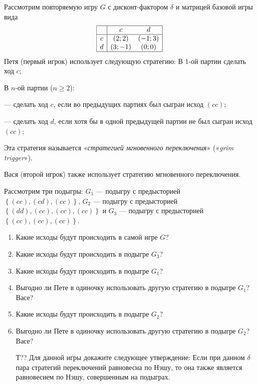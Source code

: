 \begin{problem}

Рассмотрим повторяемую игру  $G$  с дисконт-фактором  $\delta $  и матрицей базовой игры вида
\[\begin{array}{|c|cc|}  \hline {} & {c} & {d} \\  \hline {c} & {(2;2)} & {(-1;3)} \\ {d} & {(3;-1)} & {(0;0)} \\  \hline  \end{array}\]
Петя (первый игрок) использует следующую стратегию:
В 1-ой партии сделать ход  $c$;

В  $n$-ой партии ($n\ge 2$):

       — сделать ход  $c$, если во  предыдущих партиях был сыгран исход  $\left(cc\right)$;

       — сделать ход  $d$, если хотя бы в одной предыдущей партии не был сыгран исход  $\left(cc\right)$;

Эта стратегия называется «{\it стратегией мгновенного переключения}» («{\it grim trigger}»).

Вася (второй игрок) также использует стратегию мгновенного переключения.

Рассмотрим три подыгры:  $G_{1} $  — подыгру с предысторией  $\left\{\left(cc\right),\left(cd\right),\left(cc\right)\right\}$,  $G_{2} $  — подыгру с предысторией  $\left\{\left(dd\right),\left(cc\right),\left(cc\right),\left(cc\right)\right\}$  и  $G_{3} $  — подыгру с предысторией  $\left\{\left(cc\right),\left(cc\right),\left(cc\right)\right\}$.
\begin{enumerate}
\item  Какие исходы будут происходить в самой игре  $G$?\par
\item Какие исходы будут происходить в подыгре  $G_{3} $?\par
\item  Какие исходы будут происходить в подыгре  $G_{1} $?\par
\item Выгодно ли Пете в одиночку использовать другую стратегию в подыгре  $G_{1} $? Васе?\par
\item Какие исходы будут происходить в подыгре  $G_{2} $?\par
\item Выгодно ли Пете в одиночку использовать другую стратегию в подыгре  $G_{2} $? Васе?\par
{}
\item [Т??] Для данной игры докажите следующее утверждение:
Если при данном  $\delta $  пара стратегий переключений равновесна по Нэшу, то она также является равновесием по Нэшу, совершенным на подыграх.
\end{enumerate}


\begin{sol}

\end{sol}
\end{problem}



